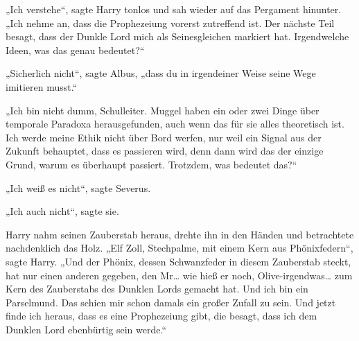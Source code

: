 „Ich verstehe“, sagte Harry tonlos und sah wieder auf das Pergament hinunter. „Ich nehme an, dass die Prophezeiung vorerst zutreffend ist. Der nächste Teil besagt, dass der Dunkle Lord mich als Seinesgleichen markiert hat. Irgendwelche Ideen, was das genau bedeutet?“

„Sicherlich nicht“, sagte Albus, „dass du in irgendeiner Weise seine Wege imitieren musst.“

„Ich bin nicht dumm, Schulleiter. Muggel haben ein oder zwei Dinge über temporale Paradoxa herausgefunden, auch wenn das für sie alles theoretisch ist. Ich werde meine Ethik nicht über Bord werfen, nur weil ein Signal aus der Zukunft behauptet, dass es passieren wird, denn dann wird das der einzige Grund, warum es überhaupt passiert. Trotzdem, was bedeutet das?“

„Ich weiß es nicht“, sagte Severus.

„Ich auch nicht“, sagte sie.

Harry nahm seinen Zauberstab heraus, drehte ihn in den Händen und betrachtete nachdenklich das Holz. „Elf Zoll, Stechpalme, mit einem Kern aus Phönixfedern“, sagte Harry. „Und der Phönix, dessen Schwanzfeder in diesem Zauberstab steckt, hat nur einen anderen gegeben, den Mr… wie hieß er noch, Olive-irgendwas… zum Kern des Zauberstabs des Dunklen Lords gemacht hat. Und ich bin ein Parselmund. Das schien mir schon damals ein großer Zufall zu sein. Und jetzt finde ich heraus, dass es eine Prophezeiung gibt, die besagt, dass ich dem Dunklen Lord ebenbürtig sein werde.“


